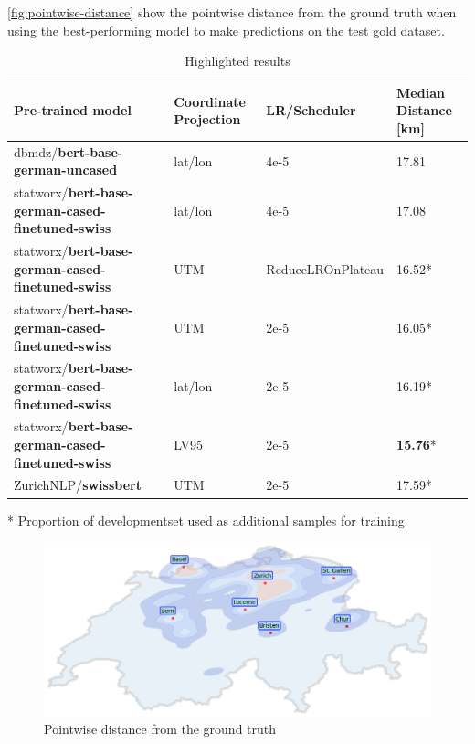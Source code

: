 \autoref{fig:pointwise-distance} show the pointwise distance from the ground truth when using the best-performing model to make predictions on the test gold dataset.

\begin{table}
    \centering
    \begin{tabular}{p{}|p{}|p{}|p{}}
        \toprule
        Pre-trained model                                        & Coordinate Projection & LR/Scheduler      & Median Distance [km] \\
        \midrule
        dbmdz/\textbf{bert-base-german-uncased}                  & lat/lon               & 4e-5              & 17.81                \\
        statworx/\textbf{bert-base-german-cased-finetuned-swiss} & lat/lon               & 4e-5              & 17.08                \\
        statworx/\textbf{bert-base-german-cased-finetuned-swiss} & UTM                   & ReduceLROnPlateau & 16.52*               \\
        statworx/\textbf{bert-base-german-cased-finetuned-swiss} & UTM                   & 2e-5              & 16.05*               \\
        statworx/\textbf{bert-base-german-cased-finetuned-swiss} & lat/lon               & 2e-5              & 16.19*               \\
        statworx/\textbf{bert-base-german-cased-finetuned-swiss} & LV95                  & 2e-5              & \textbf{15.76}*      \\
        ZurichNLP/\textbf{swissbert}                             & UTM                   & 2e-5              & 17.59*               \\
        \bottomrule
    \end{tabular}
    \caption{Highlighted results}
    \bigskip
    \raggedright
    * Proportion of developmentset used as additional samples for training \\
    \label{tbl:highlighted-results}
\end{table}

\begin{figure}
    \centering
    \includegraphics[width=\textwidth]{./figs/heatmap.png}
    \caption{Pointwise distance from the ground truth}
    \label{fig:pointwise-distance}
\end{figure}

